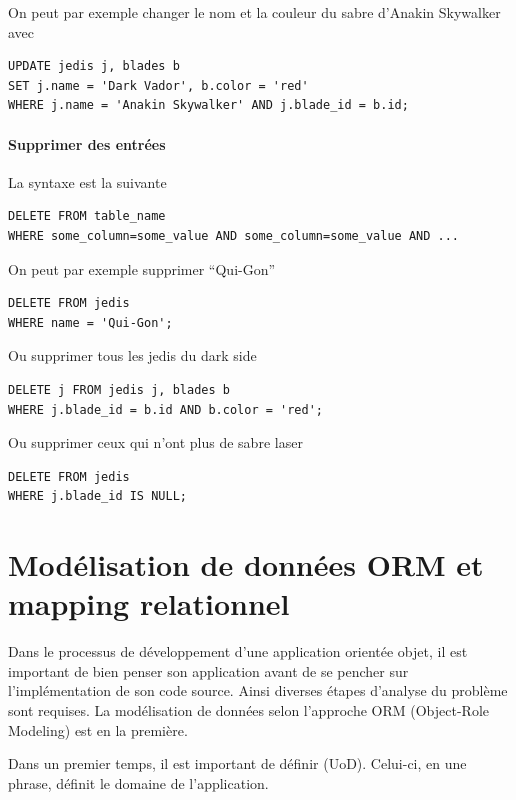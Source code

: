 On peut par exemple changer le nom et la couleur du sabre d'Anakin
Skywalker avec
\begin{lstlisting}
UPDATE jedis j, blades b
SET j.name = 'Dark Vador', b.color = 'red'
WHERE j.name = 'Anakin Skywalker' AND j.blade_id = b.id;
\end{lstlisting}

\subsection{Supprimer des entrées}
La syntaxe est la suivante
\begin{lstlisting}
DELETE FROM table_name
WHERE some_column=some_value AND some_column=some_value AND ...
\end{lstlisting}

On peut par exemple supprimer ``Qui-Gon''
\begin{lstlisting}
DELETE FROM jedis
WHERE name = 'Qui-Gon';
\end{lstlisting}

Ou supprimer tous les jedis du dark side
\begin{lstlisting}
DELETE j FROM jedis j, blades b
WHERE j.blade_id = b.id AND b.color = 'red';
\end{lstlisting}

Ou supprimer ceux qui n'ont plus de sabre laser
\begin{lstlisting}
DELETE FROM jedis
WHERE j.blade_id IS NULL;
\end{lstlisting}

\part{Modélisation de données ORM et mapping relationnel}
Dans le processus de développement d'une application orientée objet,
il est important de bien penser son application avant de se
pencher sur l'implémentation de son code source.
Ainsi diverses étapes d'analyse du problème sont requises.
La modélisation de données selon l'approche
ORM (Object-Role Modeling) est en la première.

Dans un premier temps,
il est important de définir  (UoD).
Celui-ci, en une phrase, définit le domaine de l'application.

